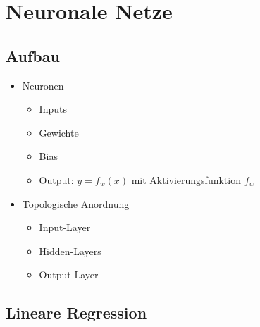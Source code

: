 \documentclass[nonacm=true, language=german]{acmart}
\begin{document}
\newpage
\section{Neuronale Netze}

\subsection{Aufbau}

\begin{itemize}
    \item Neuronen
    \begin{itemize}
        \item Inputs
        \item Gewichte
        \item Bias
        \item Output: $y = f_w(x)$ mit Aktivierungsfunktion $f_w$
    \end{itemize}
    
    \item Topologische Anordnung
    \begin{itemize}
        \item Input-Layer
        \item Hidden-Layers
        \item Output-Layer
    \end{itemize}
\end{itemize}

\subsection{Lineare Regression}
\end{document}
